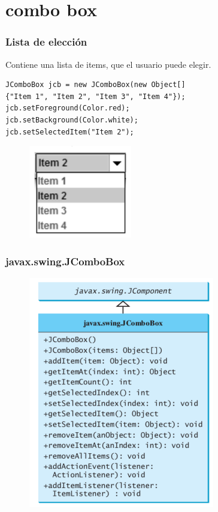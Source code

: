 \documentclass{beamer}
\begin{document}
\section{combo box}
\begin{frame}[fragile]
\frametitle{Lista de elección}
Contiene una lista de items, que el usuario puede elegir.
\begin{verbatim}
JComboBox jcb = new JComboBox(new Object[]
{"Item 1", "Item 2", "Item 3", "Item 4"});
jcb.setForeground(Color.red);
jcb.setBackground(Color.white);
jcb.setSelectedItem("Item 2");
\end{verbatim}
\begin{figure}
\includegraphics[scale=0.7]{imagenes/combobox.png} 
\end{figure} 
\end{frame}

\begin{frame}
\frametitle{javax.swing.JComboBox} 
\begin{figure}
\includegraphics[scale=0.8]{imagenes/jcombobox.png} 
\end{figure} 
\end{frame}
\end{document}
